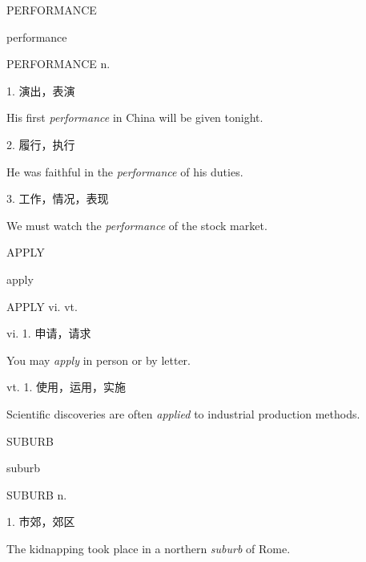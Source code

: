 \begin{flashcard}{
PERFORMANCE

performance
}
\begin{center}
PERFORMANCE n. 
\end{center}
1. 演出，表演

His first \textit{performance} in China will be given tonight.

2. 履行，执行

He was faithful in the \textit{performance} of his duties.

3. 工作，情况，表现

We must watch the \textit{performance} of the stock market.

\end{flashcard}
\begin{flashcard}{
APPLY

apply
}
\begin{center}
APPLY vi. vt. 
\end{center}
vi. 1. 申请，请求

You may \textit{apply} in person or by letter.

vt. 1. 使用，运用，实施

Scientific discoveries are often \textit{applied} to industrial production methods.

\end{flashcard}
\begin{flashcard}{
SUBURB

suburb
}
\begin{center}
SUBURB n. 
\end{center}
1. 市郊，郊区

The kidnapping took place in a northern \textit{suburb} of Rome.

\end{flashcard}
